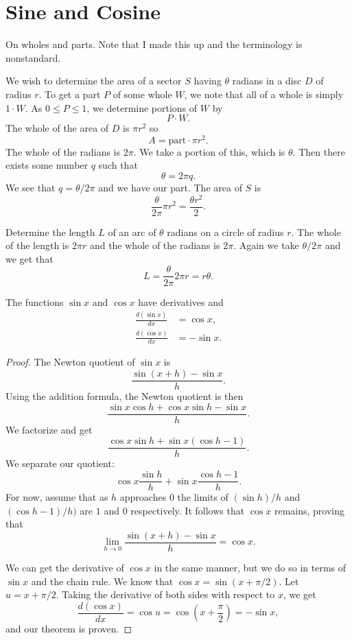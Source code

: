 \chapter*{Sine and Cosine}

On wholes and parts. Note that I made this up and the terminology is nonstandard.

We wish to determine the area of a sector $S$ having $\theta$ radians in a disc $D$ of radius $r$. To get a part $P$ of some whole $W$, we note that all of a whole is simply $1 \cdot W$. As $0 \le P \le 1$, we determine portions of $W$ by
\[P \cdot W.\]
The whole of the area of $D$ is $\pi r^2$ so
\[A = \text{part} \cdot \pi r^2.\]
The whole of the radians is $2\pi$. We take a portion of this, which is $\theta$. Then there exists some number $q$ such that
\[\theta = 2\pi q.\]
We see that $q = \theta/2\pi$ and we have our part. The area of $S$ is
\[\frac{\theta}{2\pi} \pi r^2 = \frac{\theta r^2}{2}.\]

Determine the length $L$ of an arc of $\theta$ radians on a circle of radius $r$. The whole of the length is $2\pi r$ and the whole of the radians is $2\pi$. Again we take $\theta/2\pi$ and we get that
\[L = \frac{\theta}{2\pi} 2\pi r = r\theta.\] 

\begin{theorem}
  The functions $\sin x$ and $\cos x$ have derivatives and
  \begin{align*}
    \frac{d(\sin x)}{dx} &= \cos x,\\
    \frac{d(\cos x)}{dx} &= -\sin x.
  \end{align*}
\end{theorem}

\begin{proof}
  The Newton quotient of $\sin x$ is
  \[\frac{\sin(x + h) - \sin x}{h}.\]
  Using the addition formula, the Newton quotient is then
  \[\frac{\sin x \cos h + \cos x \sin h - \sin x}{h}.\]
  We factorize and get
  \[\frac{\cos x \sin h + \sin x(\cos h - 1)}{h}.\]
  We separate our quotient:
  \[\cos x \frac{\sin h}{h} + \sin x \frac{\cos h - 1}{h}.\]
  For now, assume that as $h$ approaches $0$ the limits of $(\sin h)/h$ and $(\cos h - 1)/h)$ are $1$ and $0$ respectively.
  It follows that $\cos x$ remains, proving that
  \[\lim_{h\to0} \frac{\sin(x + h) - \sin x}{h} = \cos x.\]
  
  We can get the derivative of $\cos x$ in the same manner, but we do so in terms of $\sin x$ and the chain rule. We know that $\cos x = \sin(x + \pi/2)$. Let $u = x + \pi/2$. Taking the derivative of both sides with respect to $x$, we get
  \[\frac{d(\cos x)}{dx} = \cos u = \cos \left(x + \frac{\pi}{2} \right) = -\sin x,\]
  and our theorem is proven.
\end{proof}
